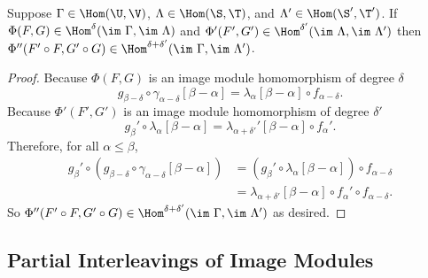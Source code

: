 \begin{lemma}\label{lem:image_composition}
  Suppose $\Gamma\in\Hom(\U,\V)$, $\Lambda\in\Hom(\S,\T)$, and $\Lambda'\in\Hom(\S',\T')$.
  If $\Phi(F, G)\in\Hom^\delta(\im~\Gamma, \im~\Lambda)$ and $\Phi'(F', G')\in\Hom^{\delta'}(\im~\Lambda, \im~\Lambda')$ then $\Phi''(F'\circ F, G'\circ G)\in\Hom^{\delta+\delta'}(\im~\Gamma,\im~\Lambda')$.
\end{lemma}
\begin{proof}
  Because $\Phi(F, G)$ is an image module homomorphism of degree $\delta$
  \[ g_{\beta-\delta}\circ\gamma_{\alpha-\delta}[\beta-\alpha] = \lambda_\alpha[\beta-\alpha]\circ f_{\alpha-\delta}.\]
  Because $\Phi'(F', G')$ is an image module homomorphism of degree $\delta'$
  \[ g_{\beta}'\circ\lambda_{\alpha}[\beta-\alpha] = \lambda_{\alpha +\delta'}'[\beta-\alpha]\circ f_{\alpha}'.\]
  Therefore, for all $\alpha\leq\beta$,
  \begin{align*}
    g_\beta'\circ (g_{\beta-\delta}\circ \gamma_{\alpha-\delta}[\beta-\alpha]) &= (g_\beta'\circ \lambda_\alpha[\beta-\alpha])\circ f_{\alpha-\delta}\\
      &=\lambda_{\alpha+\delta'}[\beta-\alpha]\circ f_\alpha'\circ f_{\alpha-\delta}.
  \end{align*}
  So $\Phi''(F'\circ F, G'\circ G)\in\Hom^{\delta+\delta'}(\im~\Gamma,\im~\Lambda')$ as desired.

\end{proof}

\subsection{Partial Interleavings of Image Modules}


